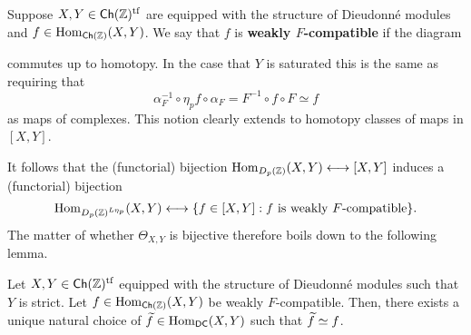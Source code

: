 \documentclass[11pt]{article}
\newcommand{\DC}{\mathsf{DC}} %
\begin{document}
\begin{definition}
Suppose $X,Y\in\operatorname{\mathsf{Ch}}(\mathbb{Z})^{\operatorname{tf}}$ are equipped with the structure of Dieudonn\'{e} modules and $f\in\operatorname{Hom}_{\operatorname{\mathsf{Ch}}(\mathbb{Z})}(X,Y)$. We say that $f$ is \textbf{weakly $F$-compatible} if the diagram
\begin{center}
\end{center}
commutes up to homotopy. In the case that $Y$ is saturated this is the same as requiring that 
$$\alpha_F^{-1}\circ\eta_pf\circ\alpha_F=F^{-1}\circ f\circ F\simeq f$$
as maps of complexes. This notion clearly extends to homotopy classes of maps in $[X,Y]$.
\end{definition}

It follows that the (functorial) bijection $\operatorname{Hom}_{D_p(\mathbb{Z})}(X,Y)\longleftrightarrow[X,Y]$ induces a (functorial) bijection
$$\operatorname{Hom}_{D_p(\mathbb{Z})^{L\eta_p}}(X,Y)\longleftrightarrow\{f\in[X,Y] : f\textrm{ is weakly }F\textrm{-compatible}\}.$$
The matter of whether $\Theta_{X,Y}$ is bijective therefore boils down to the following lemma.

\begin{lemma}
Let $X,Y\in\operatorname{\mathsf{Ch}}(\mathbb{Z})^{\operatorname{tf}}$ equipped with the structure of Dieudonn\'{e} modules such that $Y$ is strict. Let $f\in\operatorname{Hom}_{\operatorname{\mathsf{Ch}}(\mathbb{Z})}(X,Y)$ be weakly $F$-compatible. Then, there exists a unique natural choice of $\twid{f}\in\Hom_{\DC}(X,Y)$ such that $\widetilde{f}\simeq f$.
\end{lemma}
\end{document}
